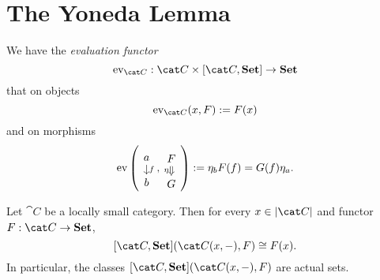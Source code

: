 
\section{The Yoneda Lemma}


 

We have the {\em evaluation functor}
\[\ev_{\cat C} : \cat C \times [\cat C, \Set] \to \Set\]
that on objects
\[\ev_{\cat C}(x, F) := F(x)\]
and on morphisms
\[\ev\left(\begin{tikzcd}[row sep=small] a \ar["f", d] \\ b \end{tikzcd}, \begin{tikzcd}[row sep=small] F \ar["\eta", d, swap, Rightarrow] \\ G \end{tikzcd}\right) := \eta_b F(f) = G(f) \eta_a .\]

\begin{lemma}\label{lemma:YonedaLemmaLemma}
Let \(\cat C\) be a locally small category. Then for every \(x \in \obj{\cat C}\) and functor \(F : \cat C \to \Set\),
\[[\cat C, \Set](\cat C(x, -), F) \cong F(x) .\]
In particular, the classes \([\cat C, \Set](\cat C(x, -), F)\) are  actual sets.
\end{lemma}

